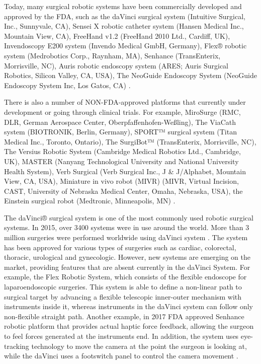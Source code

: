 Today, many surgical robotic systems have been commercially developed and approved by the FDA, such as the daVinci surgical system (Intuitive Surgical, Inc., Sunnyvale, CA), Sensei X robotic catheter system (Hansen Medical Inc., Mountain View, CA), FreeHand v1.2 (FreeHand 2010 Ltd., Cardiff, UK), Invendoscopy E200 system (Invendo Medical GmbH, Germany), Flex® robotic system (Medrobotics Corp., Raynham, MA), Senhance (TransEnterix, Morrisville, NC), Auris robotic endoscopy system (ARES; Auris Surgical Robotics, Silicon Valley, CA, USA), The NeoGuide Endoscopy System (NeoGuide Endoscopy System Inc, Los Gatos, CA) \cite{lanfranco_robotic_2004,peters_review_2018}.

There is also a number of NON-FDA-approved platforms that currently under development or going through clinical trials. For example, MiroSurge (RMC, DLR, German Aerospace Center, Oberpfaffenhofen-Weßling), The ViaCath system (BIOTRONIK, Berlin, Germany), SPORT™ surgical system (Titan Medical Inc., Toronto, Ontario), The SurgiBot™ (TransEnterix, Morrisville, NC), The Versius Robotic System (Cambridge Medical Robotics Ltd., Cambridge, UK), MASTER (Nanyang Technological University and National University Health System), Verb Surgical (Verb Surgical Inc., J \& J/Alphabet, Mountain View, CA, USA), Miniature in vivo robot (MIVR) (MIVR, Virtual Incision, CAST, University of Nebraska Medical Center, Omaha, Nebraska, USA), the Einstein surgical robot (Medtronic, Minneapolis, MN) \cite{peters_review_2018}.

The daVinci® surgical system is one of the most commonly used robotic surgical systems. In 2015, over 3400 systems were in use around the world. More than 3 million surgeries were performed worldwide using daVinci system \cite{_intuitive_2018}. The system has been approved for various types of surgeries such as cardiac, colorectal, thoracic, urological and gynecologic. However, new systems are emerging on the market, providing features that are absent currently in the daVinci System. For example, the Flex Robotic System, which consists of the flexible endoscope for laparoendoscopic surgeries. This system is able to define a non-linear path to surgical target by advancing a flexible telescopic inner-outer mechanism with instruments inside it, whereas instruments in the daVinci system can follow only non-flexible straight path. Another example, in 2017 FDA approved Senhance robotic platform that provides actual haptic force feedback, allowing the surgeon to feel forces generated at the instruments end. In addition, the system uses eye-tracking technology to move the camera at the point the surgeon is looking at, while the daVinci uses a footswitch panel to control the camera movement \cite{peters_review_2018}.

